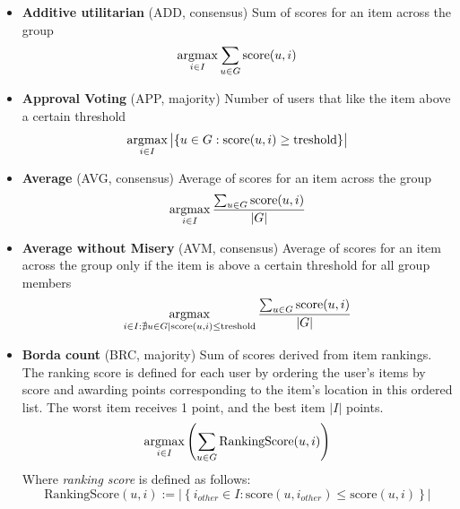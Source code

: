 \begin{itemize}
    \item \textbf{Additive utilitarian} (ADD, consensus)\newline
        Sum of scores for an item across the group
        \begin{equation}
            \operatorname*{argmax}_{i \in I}{\sum_{u \in G}{\textrm{score}(u,i)}}
        \end{equation}
    
    \item \textbf{Approval Voting} (APP, majority)\newline
        Number of users that like the item above a certain threshold
        \begin{equation}
            \operatorname*{argmax}_{i \in I}{
                \big\lvert{\left\{
                    u \in G : \textrm{score}(u,i) \geq \textrm{treshold}
                \right\}}\big\rvert
            }
        \end{equation}
    
    \item \textbf{Average} (AVG, consensus)\newline
        Average of scores for an item across the group
        \begin{equation}
            \operatorname*{argmax}_{i \in I}{\dfrac{\sum_{u \in G}{\textrm{score}(u,i)}}{\left\lvert{G}\right\rvert}}
        \end{equation}
    
    \item \textbf{Average without Misery} (AVM, consensus)\newline
        Average of scores for an item across the group only if the item is above a certain threshold for all group members
        \begin{equation}
            \operatorname*{argmax}_{ i \in I : \nexists u \in G | \textrm{score}(u,i) \leq \textrm{treshold}}{
                \dfrac{\sum_{u \in G}{\textrm{score}(u,i)}}{\left\lvert{G}\right\rvert}
            }
        \end{equation}
        
    \item \textbf{Borda count} (BRC, majority)\newline
        Sum of scores derived from item rankings. The ranking score is defined for each user by ordering the user's items by score and awarding points corresponding to the item's location in this ordered list. The worst item receives 1 point, and the best item $|I|$ points.
        \begin{equation}
                \operatorname*{argmax}_{i \in I}{\left(\sum_{u \in G}{\textrm{RankingScore}(u,i)}\right)}
            \end{equation}
        Where \textit{ranking score} is defined as follows:
        \begin{equation*}
            \textrm{RankingScore}(u,i) := 
            \big\lvert{\left\{
                i_{other} \in I : \textrm{score}(u,i_{other}) \leq \textrm{score}(u,i)
            \right\}}\big\rvert
        \end{equation*}
    

\end{itemize}
